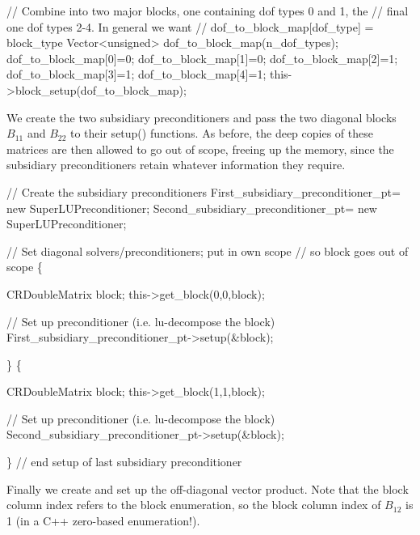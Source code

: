 \begin{DoxyCodeInclude}
  \textcolor{comment}{// Combine into two major blocks, one containing dof types 0 and 1, the}
  \textcolor{comment}{// final one dof types 2-4. In general we want}
  \textcolor{comment}{// dof\_to\_block\_map[dof\_type] = block\_type}
  Vector<unsigned> dof\_to\_block\_map(n\_dof\_types);
  dof\_to\_block\_map[0]=0;
  dof\_to\_block\_map[1]=0;
  dof\_to\_block\_map[2]=1;
  dof\_to\_block\_map[3]=1;
  dof\_to\_block\_map[4]=1;
  this->block\_setup(dof\_to\_block\_map);

\end{DoxyCodeInclude}


We create the two subsidiary preconditioners and pass the two diagonal blocks $ B_{11} $ and $ B_{22} $ to their {\ttfamily setup()} functions. As before, the deep copies of these matrices are then allowed to go out of scope, freeing up the memory, since the subsidiary preconditioners retain whatever information they require.


\begin{DoxyCodeInclude}
  \textcolor{comment}{// Create the subsidiary preconditioners}
  First\_subsidiary\_preconditioner\_pt= \textcolor{keyword}{new} SuperLUPreconditioner;
  Second\_subsidiary\_preconditioner\_pt= \textcolor{keyword}{new} SuperLUPreconditioner;

  \textcolor{comment}{// Set diagonal solvers/preconditioners; put in own scope}
  \textcolor{comment}{// so block goes out of scope}
  \{

   CRDoubleMatrix block;
   this->get\_block(0,0,block);
   
   \textcolor{comment}{// Set up preconditioner (i.e. lu-decompose the block)}
   First\_subsidiary\_preconditioner\_pt->setup(&block);

  \}
  \{

   CRDoubleMatrix block;
   this->get\_block(1,1,block);
   
   \textcolor{comment}{// Set up preconditioner (i.e. lu-decompose the block)}
   Second\_subsidiary\_preconditioner\_pt->setup(&block);

  \} \textcolor{comment}{// end setup of last subsidiary preconditioner}

\end{DoxyCodeInclude}


Finally we create and set up the off-\/diagonal vector product. Note that the block column index refers to the block enumeration, so the block column index of $ B_{12} $ is 1 (in a C++ zero-\/based enumeration!).


